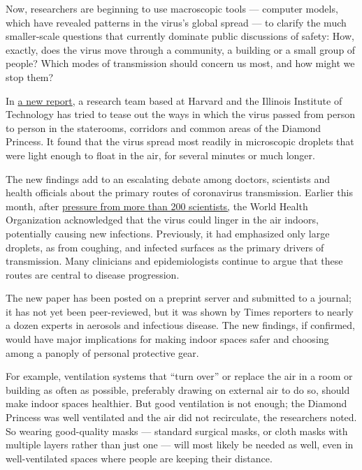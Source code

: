 Now, researchers are beginning to use macroscopic tools --- computer
models, which have revealed patterns in the virus's global spread --- to
clarify the much smaller-scale questions that currently dominate public
discussions of safety: How, exactly, does the virus move through a
community, a building or a small group of people? Which modes of
transmission should concern us most, and how might we stop them?

In
\href{https://www.medrxiv.org/content/10.1101/2020.07.13.20153049v1}{a
new report}, a research team based at Harvard and the Illinois Institute
of Technology has tried to tease out the ways in which the virus passed
from person to person in the staterooms, corridors and common areas of
the Diamond Princess. It found that the virus spread most readily in
microscopic droplets that were light enough to float in the air, for
several minutes or much longer.

The new findings add to an escalating debate among doctors, scientists
and health officials about the primary routes of coronavirus
transmission. Earlier this month, after
\href{https://www.nytimes.com/2020/07/04/health/239-experts-with-one-big-claim-the-coronavirus-is-airborne.html}{pressure
from more than 200 scientists,} the World Health Organization
acknowledged that the virus could linger in the air indoors, potentially
causing new infections. Previously, it had emphasized only large
droplets, as from coughing, and infected surfaces as the primary drivers
of transmission. Many clinicians and epidemiologists continue to argue
that these routes are central to disease progression.

The new paper has been posted on a preprint server and submitted to a
journal; it has not yet been peer-reviewed, but it was shown by Times
reporters to nearly a dozen experts in aerosols and infectious disease.
The new findings, if confirmed, would have major implications for making
indoor spaces safer and choosing among a panoply of personal protective
gear.

For example, ventilation systems that ``turn over'' or replace the air
in a room or building as often as possible, preferably drawing on
external air to do so, should make indoor spaces healthier. But good
ventilation is not enough; the Diamond Princess was well ventilated and
the air did not recirculate, the researchers noted. So wearing
good-quality masks --- standard surgical masks, or cloth masks with
multiple layers rather than just one --- will most likely be needed as
well, even in well-ventilated spaces where people are keeping their
distance.

